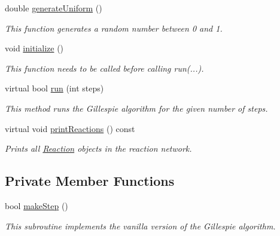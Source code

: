 \begin{DoxyCompactItemize}
double \hyperlink{classChemSimpleGillespieImpl_ab9fb1f953021fc92bfe1a0564587c124}{generate\+Uniform} ()
\begin{DoxyCompactList}\small\item\em This function generates a random number between 0 and 1. \end{DoxyCompactList}\item 
void \hyperlink{classChemSimpleGillespieImpl_a33a705cbb753c22e9cfcd4ef23c1e73d}{initialize} ()
\begin{DoxyCompactList}\small\item\em This function needs to be called before calling run(...). \end{DoxyCompactList}\item 
virtual bool \hyperlink{classChemSimpleGillespieImpl_ad74138f20a8d916f30b0cb4342c27c71}{run} (int steps)
\begin{DoxyCompactList}\small\item\em This method runs the Gillespie algorithm for the given number of steps. \end{DoxyCompactList}\item 
virtual void \hyperlink{classChemSimpleGillespieImpl_a88a438f0f52eae068ab81492427a4458}{print\+Reactions} () const 
\begin{DoxyCompactList}\small\item\em Prints all \hyperlink{classReaction}{Reaction} objects in the reaction network. \end{DoxyCompactList}\end{DoxyCompactItemize}
\subsection*{Private Member Functions}
\begin{DoxyCompactItemize}
\item 
bool \hyperlink{classChemSimpleGillespieImpl_a21e4c513f9d668b6c0df7fc52e9d5430}{make\+Step} ()
\begin{DoxyCompactList}\small\item\em This subroutine implements the vanilla version of the Gillespie algorithm. \end{DoxyCompactList}\end{DoxyCompactItemize}
